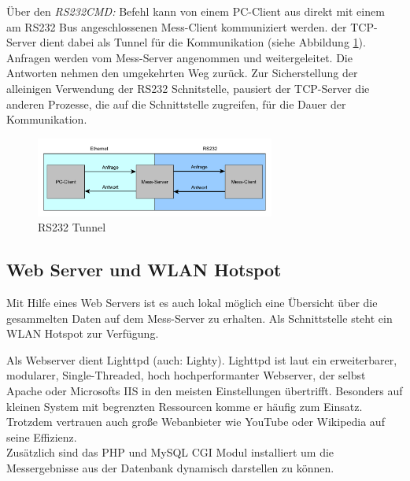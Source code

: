 Über den \textit{RS232CMD:} Befehl kann von einem PC-Client aus direkt mit einem am RS232 Bus angeschlossenen Mess-Client kommuniziert werden. der TCP-Server dient dabei als Tunnel für die Kommunikation (siehe Abbildung \ref{figure_RS232Tunnel}). Anfragen werden vom Mess-Server angenommen und weitergeleitet. Die Antworten nehmen den umgekehrten Weg zurück. Zur Sicherstellung der alleinigen Verwendung der RS232 Schnitstelle, pausiert der TCP-Server die anderen Prozesse, die auf die Schnittstelle zugreifen, für die Dauer der Kommunikation.\ 


\begin{figure}[H]
\begin{center}
\includegraphics[width=0.7\textwidth ]{img/general/RS232Tunnel.pdf}
\caption{RS232 Tunnel}
\label{figure_RS232Tunnel}
\end{center}
\end{figure}

\newpage
\subsection{Web Server und WLAN Hotspot}
\label{section_WebServerWLANHotspot}

Mit Hilfe eines Web Servers ist es auch lokal möglich eine Übersicht über die gesammelten Daten auf dem Mess-Server zu erhalten. Als Schnittstelle steht ein WLAN Hotspot zur Verfügung.\ 

Als Webserver dient Lighttpd (auch: Lighty). Lighttpd ist laut \cite{bogus2008lighttpd} ein erweiterbarer, modularer, Single-Threaded, hoch hochperformanter Webserver, der selbst Apache oder Microsofts IIS in den meisten Einstellungen übertrifft. Besonders auf kleinen System mit begrenzten Ressourcen komme er häufig zum Einsatz. Trotzdem vertrauen auch große Webanbieter wie YouTube oder Wikipedia auf seine Effizienz.\\
Zusätzlich sind das PHP und MySQL \ac{CGI} Modul installiert um die Messergebnisse aus der Datenbank dynamisch darstellen zu können. 

